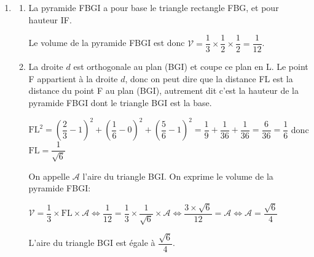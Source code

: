 \begin{enumerate}
\begin{enumerate}

Le point L est donc le point d'intersection de la droite $d$ et du plan (BGI).
\end{enumerate}

\item 


\begin{enumerate}
\item La pyramide FBGI a pour base le triangle rectangle FBG, et pour hauteur IF.


Le volume de la pyramide FBGI est donc $\mathcal{V}=\dfrac{1}{3}\times \dfrac{1}{2}\times \dfrac{1}{2} =\dfrac{1}{12}$.

\item 
La droite $d$ est orthogonale au plan (BGI) et coupe ce plan en L. Le point F appartient à la droite $d$, donc on peut dire que la distance FL est la distance du point F au plan (BGI), autrement dit c'est la hauteur de la pyramide FBGI dont le triangle BGI est la base.

$\text{FL}^2 = \left (\dfrac{2}{3} -1\right )^2 + \left (\dfrac{1}{6}-0 \right )^2 + \left (\dfrac{5}{6} -1\right )^2
= \dfrac{1}{9} + \dfrac{1}{36} + \dfrac{1}{36} = \dfrac{6}{36} = \dfrac{1}{6}$
donc
$\text{FL} = \dfrac{1}{\sqrt{6}}$

On appelle $\mathcal{A}$ l'aire du triangle BGI.
On exprime le volume de la pyramide FBGI:

$\mathcal{V} = \dfrac{1}{3}\times \text{FL}\times \mathcal{A}
\iff
\dfrac{1}{12} = \dfrac{1}{3}\times \dfrac{1}{\sqrt{6}} \times \mathcal{A}
\iff
\dfrac{3\times \sqrt{6}}{12} = \mathcal{A}
\iff
\mathcal{A} = \dfrac{\sqrt{6}}{4}$

L'aire du triangle BGI est égale à $ \dfrac{\sqrt{6}}{4}$.

\end{enumerate}

\end{enumerate}

\bigskip
